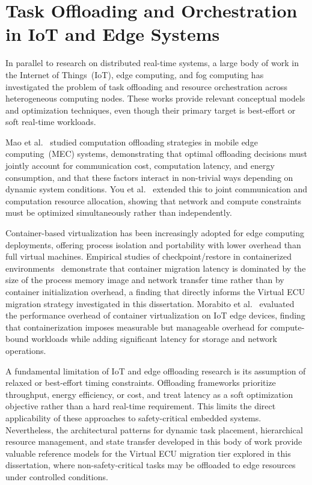 \section{Task Offloading and Orchestration in IoT and Edge Systems}
\label{sec:rw_edge}

In parallel to research on distributed real-time systems, a large body of work in the
Internet of Things~(IoT), edge computing, and fog computing has investigated the
problem of task offloading and resource orchestration across heterogeneous computing
nodes. These works provide relevant conceptual models and optimization techniques,
even though their primary target is best-effort or soft real-time workloads.

Mao et al.~\cite{mao2017mobile} studied computation offloading strategies in mobile
edge computing~(MEC) systems, demonstrating that optimal offloading decisions must
jointly account for communication cost, computation latency, and energy consumption,
and that these factors interact in non-trivial ways depending on dynamic system
conditions. You et al.~\cite{you2017energy} extended this to joint communication and
computation resource allocation, showing that network and compute constraints must
be optimized simultaneously rather than independently.

Container-based virtualization has been increasingly adopted for edge computing
deployments, offering process isolation and portability with lower overhead than
full virtual machines. Empirical studies of checkpoint/restore in containerized
environments~\cite{tosic2023} demonstrate that container migration latency is
dominated by the size of the process memory image and network transfer time rather
than by container initialization overhead, a finding that directly informs the
Virtual ECU migration strategy investigated in this dissertation. Morabito et
al.~\cite{morabito2018} evaluated the performance overhead of container
virtualization on IoT edge devices, finding that containerization imposes measurable
but manageable overhead for compute-bound workloads while adding significant latency
for storage and network operations.

A fundamental limitation of IoT and edge offloading research is its assumption of
relaxed or best-effort timing constraints. Offloading frameworks prioritize
throughput, energy efficiency, or cost, and treat latency as a soft optimization
objective rather than a hard real-time requirement. This limits the direct
applicability of these approaches to safety-critical embedded systems. Nevertheless,
the architectural patterns for dynamic task placement, hierarchical resource
management, and state transfer developed in this body of work provide valuable
reference models for the Virtual ECU migration tier explored in this dissertation,
where non-safety-critical tasks may be offloaded to edge resources under controlled
conditions.

